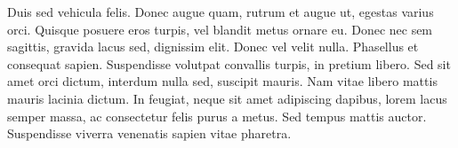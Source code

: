Duis sed vehicula felis. Donec augue quam, rutrum et augue ut, egestas
varius orci. Quisque posuere eros turpis, vel blandit metus ornare eu.
Donec nec sem sagittis, gravida lacus sed, dignissim elit. Donec vel
velit nulla. Phasellus et consequat sapien. Suspendisse volutpat
convallis turpis, in pretium libero. Sed sit amet orci dictum, interdum
nulla sed, suscipit mauris. Nam vitae libero mattis mauris lacinia
dictum. In feugiat, neque sit amet adipiscing dapibus, lorem lacus
semper massa, ac consectetur felis purus a metus. Sed tempus mattis
auctor. Suspendisse viverra venenatis sapien vitae pharetra.
